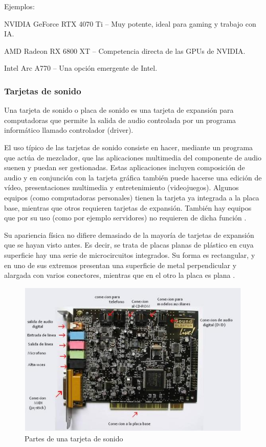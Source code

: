 Ejemplos:

NVIDIA GeForce RTX 4070 Ti – Muy potente, ideal para gaming y trabajo con IA.

AMD Radeon RX 6800 XT – Competencia directa de las GPUs de NVIDIA.

Intel Arc A770 – Una opción emergente de Intel.

\subsubsection{Tarjetas de sonido}

Una tarjeta de sonido o placa de sonido es una tarjeta de expansión para computadoras que permite la salida de audio controlada por un programa informático llamado controlador (driver).

El uso típico de las tarjetas de sonido consiste en hacer, mediante un programa que actúa de mezclador, que las aplicaciones multimedia del componente de audio suenen y puedan ser gestionadas. Estas aplicaciones incluyen composición de audio y en conjunción con la tarjeta gráfica también puede hacerse una edición de vídeo, presentaciones multimedia y entretenimiento (videojuegos). Algunos equipos (como computadoras personales) tienen la tarjeta ya integrada a la placa base, mientras que otros requieren tarjetas de expansión. También hay equipos que por su uso (como por ejemplo servidores) no requieren de dicha función \cite{tuhome}.

Su apariencia física no difiere demasiado de la mayoría de tarjetas de expansión que se hayan visto antes. Es decir, se trata de placas planas de plástico en cuya superficie hay una serie de microcircuitos integrados. Su forma es rectangular, y en uno de sus extremos presentan una superficie de metal perpendicular y alargada con varios conectores, mientras que en el otro la placa es plana \cite{conceptarjsond}.

\begin{figure}
  \centering
  \includegraphics[scale=0.8]{imagenes/tarjeta-sonido.png}
  \caption{Partes de una tarjeta de sonido}
\end{figure}

